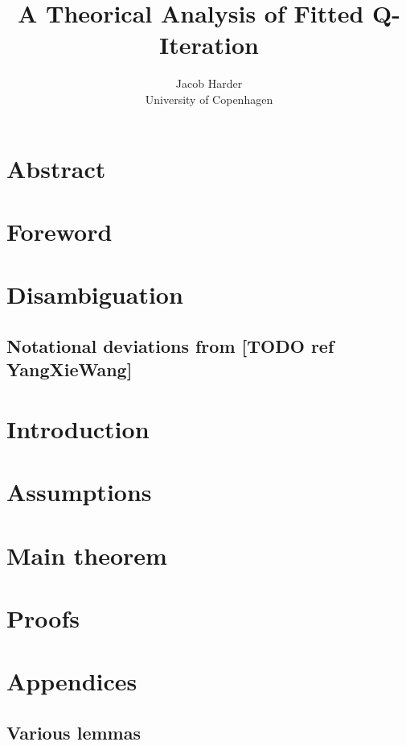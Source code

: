 \documentclass{article}
\title{A Theorical Analysis of Fitted Q-Iteration}
\author{Jacob Harder \\ University of Copenhagen}
\begin{document}
\maketitle

\section{Abstract}

\section{Foreword}


\section{Disambiguation}


\subsection{Notational deviations from [TODO ref YangXieWang]}


\section{Introduction}


\section{Assumptions}


\section{Main theorem}


\section{Proofs}












\section{Appendices}
\subsection{Various lemmas}


\end{document}

